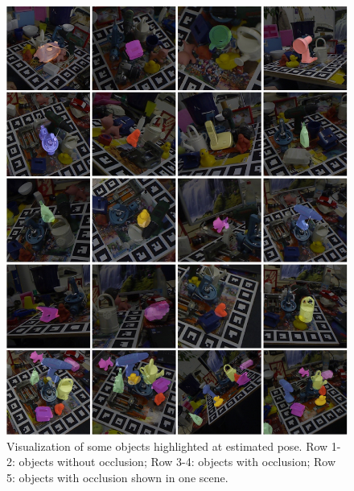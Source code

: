 \documentclass[12pt,DIV14,BCOR12mm,a4paper,footinclude=false,headinclude,parskip=half-,twoside,openright,cleardoublepage=empty,toc=index,bibliography=totoc,listof=totoc]{scrreprt}
\numberwithin{equation}{chapter}
\begin{document}
\begin{figure}[H]
	\centering
	\includegraphics[width=1.\textwidth]{img/vis_all.pdf}
	\caption{Visualization of some objects highlighted at estimated pose. Row 1-2: objects without occlusion; Row 3-4: objects with occlusion; Row 5: objects with occlusion shown in one scene.}
	\label{img:vis_all}
\end{figure}
\end{document}
